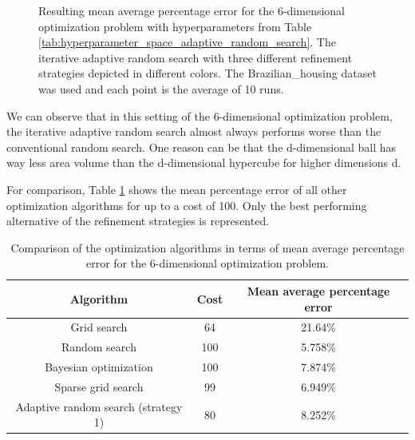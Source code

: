 \begin{figure}[H]
	\caption{ Resulting mean average percentage error for the 6-dimensional optimization problem with hyperparameters from Table \ref{tab:hyperparameter_space_adaptive_random_search}. The iterative adaptive random search with three different refinement strategies depicted in different colors. The Brazilian\_housing dataset was used and each point is the average of 10 runs. }	
	\label{fig:result_adaptive_random_high_dim}
\end{figure}

We can observe that in this setting of the 6-dimensional optimization problem, the iterative adaptive random search almost always performs worse than the conventional random search. One reason can be that the d-dimensional ball has way less area volume than the d-dimensional hypercube for higher dimensions d. \newline 

For comparison, Table \ref{tab:comparison_all_algorithms} shows the mean percentage error of all other optimization algorithms for up to a cost of 100. Only the best performing alternative of the refinement strategies is represented.

\begin{table}[H]
	\caption{ Comparison of the optimization algorithms in terms of mean average percentage error for the 6-dimensional optimization problem. }
	\label{tab:comparison_all_algorithms}
	\centering
	\begin{tabular}{| c c c |} 
		\hline
		Algorithm & Cost & Mean average percentage error \\ 
		\hline
		Grid search & 64 & 21.64\% \\ 
		Random search & 100 & 5.758\% \\
		Bayesian optimization & 100 & 7.874\% \\
		Sparse grid search & 99 & 6.949\% \\
		Adaptive random search (strategy 1) & 80 & 8.252\% \\
		\hline
	\end{tabular}
\end{table}


